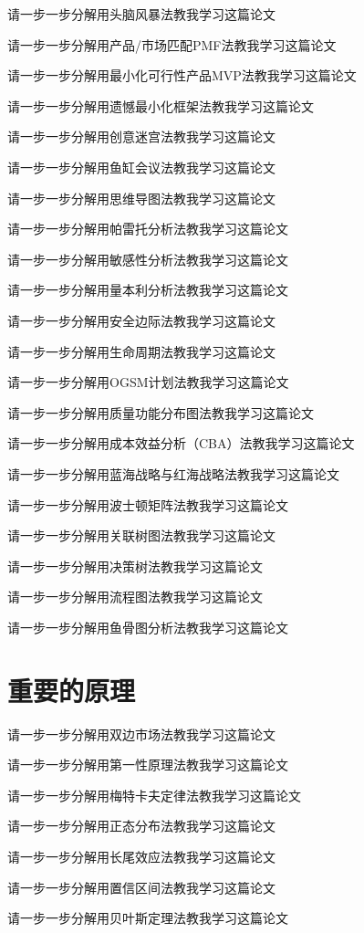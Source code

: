 \documentclass[12pt]{book}
\begin{document}
请一步一步分解用头脑风暴法教我学习这篇论文

请一步一步分解用产品/市场匹配PMF法教我学习这篇论文

请一步一步分解用最小化可行性产品MVP法教我学习这篇论文

请一步一步分解用遗憾最小化框架法教我学习这篇论文

请一步一步分解用创意迷宫法教我学习这篇论文

请一步一步分解用鱼缸会议法教我学习这篇论文

请一步一步分解用思维导图法教我学习这篇论文

请一步一步分解用帕雷托分析法教我学习这篇论文

请一步一步分解用敏感性分析法教我学习这篇论文

请一步一步分解用量本利分析法教我学习这篇论文

请一步一步分解用安全边际法教我学习这篇论文

请一步一步分解用生命周期法教我学习这篇论文

请一步一步分解用OGSM计划法教我学习这篇论文

请一步一步分解用质量功能分布图法教我学习这篇论文

请一步一步分解用成本效益分析（CBA）法教我学习这篇论文

请一步一步分解用蓝海战略与红海战略法教我学习这篇论文

请一步一步分解用波士顿矩阵法教我学习这篇论文

请一步一步分解用关联树图法教我学习这篇论文

请一步一步分解用决策树法教我学习这篇论文

请一步一步分解用流程图法教我学习这篇论文

请一步一步分解用鱼骨图分析法教我学习这篇论文


\section{重要的原理}
请一步一步分解用双边市场法教我学习这篇论文

请一步一步分解用第一性原理法教我学习这篇论文

请一步一步分解用梅特卡夫定律法教我学习这篇论文


请一步一步分解用正态分布法教我学习这篇论文

请一步一步分解用长尾效应法教我学习这篇论文


请一步一步分解用置信区间法教我学习这篇论文


请一步一步分解用贝叶斯定理法教我学习这篇论文
\end{document}
